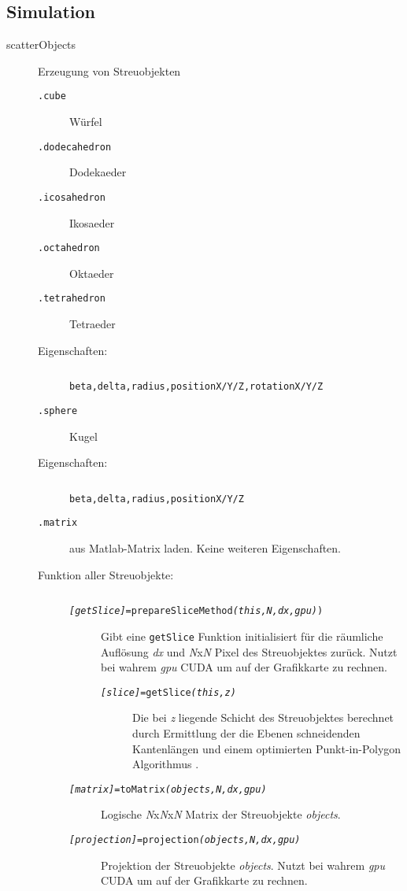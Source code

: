 \subsection*{Simulation}
\begin{description}
	\item[scatterObjects]Erzeugung von Streuobjekten
	\begin{description}
		\item[\texttt{.cube}] Würfel
		\item[\texttt{.dodecahedron}] Dodekaeder
		\item[\texttt{.icosahedron}] Ikosaeder
		\item[\texttt{.octahedron}] Oktaeder
		\item[\texttt{.tetrahedron}] Tetraeder
		\item[\normalfont Eigenschaften:]$ $
		\begin{description}
			\item[\texttt{beta,delta,radius,positionX/Y/Z,rotationX/Y/Z}]
		\end{description}
		
		\item[\texttt{.sphere}] Kugel
		\item[\normalfont Eigenschaften:]$ $
		\begin{description}
			\item[\texttt{beta,delta,radius,positionX/Y/Z}]
		\end{description}
		
		\item[\texttt{.matrix}] aus Matlab-Matrix laden. Keine weiteren Eigenschaften.
		\item[\normalfont Funktion aller Streuobjekte:]$ $
			\begin{description}
				\item[\texttt{\textit{[getSlice]}=prepareSliceMethod\textit{(this,N,dx,gpu)})}] Gibt eine \texttt{getSlice} Funktion initialisiert für die räumliche Auflösung \textit{dx} und \textit{N}x\textit{N} Pixel des Streuobjektes zurück. Nutzt bei wahrem \textit{gpu} CUDA um auf der Grafikkarte zu rechnen.
				\begin{description}
					\item [\texttt{\textit{[slice]}=getSlice\textit{(this,z)}}] Die bei \textit{z} liegende Schicht des Streuobjektes berechnet durch Ermittlung der die Ebenen schneidenden Kantenlängen und einem optimierten Punkt-in-Polygon Algorithmus \cite{pnpoly}.
				\end{description}
				
				\item[\texttt{\textit{[matrix]}=toMatrix\textit{(objects,N,dx,gpu)}}] Logische \textit{N}x\textit{N}x\textit{N} Matrix der Streuobjekte \textit{objects}.
				\item[\texttt{\textit{[projection]}=projection\textit{(objects,N,dx,gpu)}}] Projektion der Streuobjekte \textit{objects}. Nutzt bei wahrem \textit{gpu} CUDA um auf der Grafikkarte zu rechnen.
			\end{description}
	\end{description}	
\end{description}


